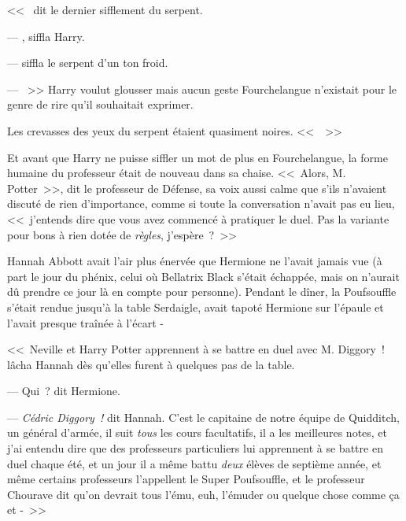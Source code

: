 <<~ dit le dernier sifflement du serpent. 

--- , siffla Harry. 

---  siffla le serpent d'un ton froid. 

--- ~>> Harry voulut glousser mais aucun geste Fourchelangue n'existait pour le genre de rire qu'il souhaitait exprimer.

Les crevasses des yeux du serpent étaient quasiment noires. <<~~>>

Et avant que Harry ne puisse siffler un mot de plus en Fourchelangue, la forme humaine du professeur était de nouveau dans sa chaise. <<~Alors, M. Potter~>>, dit le professeur de Défense, sa voix aussi calme que s'ils n'avaient discuté de rien d'importance, comme si toute la conversation n'avait pas eu lieu, <<~j'entends dire que vous avez commencé à pratiquer le duel. Pas la variante pour bons à rien dotée de \emph{règles}, j'espère~?~>>

\later

Hannah Abbott avait l'air plus énervée que Hermione ne l'avait jamais vue (à part le jour du phénix, celui où Bellatrix Black s'était échappée, mais on n'aurait dû prendre ce jour là en compte pour personne). Pendant le dîner, la Poufsouffle s'était rendue jusqu'à la table Serdaigle, avait tapoté Hermione sur l'épaule et l'avait presque traînée à l'écart -

<<~Neville et Harry Potter apprennent à se battre en duel avec M. Diggory~! lâcha Hannah dès qu'elles furent à quelques pas de la table.

--- Qui~? dit Hermione.

--- \emph{Cédric Diggory~!} dit Hannah. C'est le capitaine de notre équipe de Quidditch, un général d'armée, il suit \emph{tous} les cours facultatifs, il a les meilleures notes, et j'ai entendu dire que des professeurs particuliers lui apprennent à se battre en duel chaque été, et un jour il a même battu \emph{deux} élèves de septième année, et même certains professeurs l'appellent le Super Poufsouffle, et le professeur Chourave dit qu'on devrait tous l'ému, euh, l'émuder ou quelque chose comme ça et -~>>

